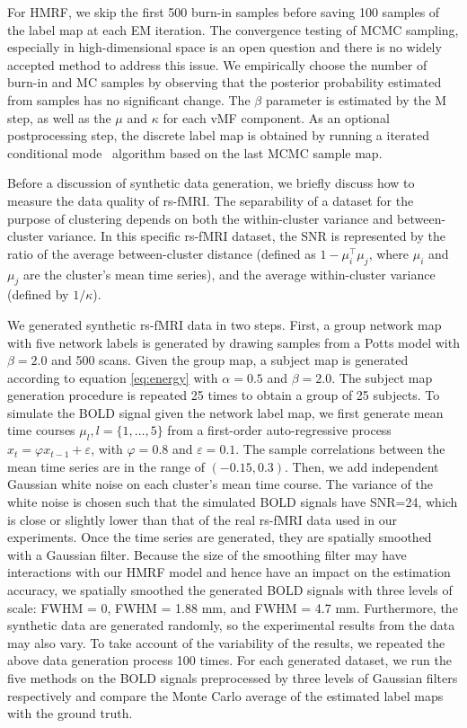 \documentclass[review,authoryear]{elsarticle}
\begin{document}
For HMRF, we skip the first 500 burn-in samples before saving 100 samples of the
label map at each EM iteration. The convergence testing of MCMC sampling,
especially in high-dimensional space is an open question and there is no widely
accepted method to address this issue. We empirically choose the number of
burn-in and MC samples by observing that the posterior probability estimated
from samples has no significant change. The $\beta$ parameter is estimated by
the M step, as well as the $\mu$ and $\kappa$ for each vMF component.  As an
optional postprocessing step, the discrete label map is obtained by running a
iterated conditional mode~\citep{besag1986statistical} algorithm based on the
last MCMC sample map.

Before a discussion of synthetic data generation, we briefly discuss how to
measure the data quality of rs-fMRI. The separability of a dataset for the
purpose of clustering depends on both the within-cluster variance and
between-cluster variance. In this specific rs-fMRI dataset, the SNR is
represented by the ratio of the average between-cluster distance (defined as $1
-\mu_i^\intercal \mu_j$, where $\mu_i$ and $\mu_j$ are the cluster's mean time
series), and the average within-cluster variance (defined by $1/\kappa$).

We generated synthetic rs-fMRI data in two steps. First, a group network map
with five network labels is generated by drawing samples from a Potts model with
$\beta = 2.0$ and 500 scans. Given the group map, a subject map is generated
according to equation \eqref{eq:energy} with $\alpha=0.5$ and $\beta = 2.0$. The
subject map generation procedure is repeated 25 times to obtain a group of 25
subjects. To simulate the BOLD signal given the network label map, we first
generate mean time courses $\mu_l, l=\{1,\dots, 5\}$ from a first-order
auto-regressive process $x_t = \varphi x_{t-1} + \varepsilon$, with $\varphi =
0.8$ and $\varepsilon = 0.1$.  The sample correlations between the mean time
series are in the range of $(-0.15, 0.3)$. Then, we add independent Gaussian
white noise on each cluster's mean time course. The variance of the white noise
is chosen such that the simulated BOLD signals have SNR=24, which is close or
slightly lower than that of the real rs-fMRI data used in our experiments. Once
the time series are generated, they are spatially smoothed with a Gaussian
filter. Because the size of the smoothing filter may have interactions with our
HMRF model and hence have an impact on the estimation accuracy, we spatially
smoothed the generated BOLD signals with three levels of scale: FWHM = 0, FWHM =
1.88 mm, and FWHM = 4.7 mm.  Furthermore, the synthetic data are generated
randomly, so the experimental results from the data may also vary. To take
account of the variability of the results, we repeated the above data generation
process 100 times.  For each generated dataset, we run the five methods on the
BOLD signals preprocessed by three levels of Gaussian filters respectively and
compare the Monte Carlo average of the estimated label maps with the ground
truth.
\end{document}
